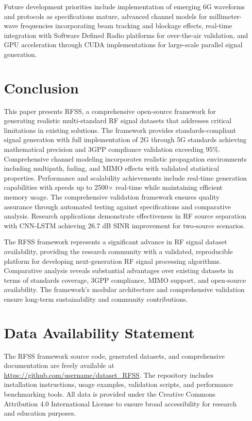 \documentclass[twocolumn,10pt]{article}
\begin{document}
Future development priorities include implementation of emerging 6G waveforms and protocols as specifications mature, advanced channel models for millimeter-wave frequencies incorporating beam tracking and blockage effects, real-time integration with Software Defined Radio platforms for over-the-air validation, and GPU acceleration through CUDA implementations for large-scale parallel signal generation.

\section{Conclusion}

This paper presents RFSS, a comprehensive open-source framework for generating realistic multi-standard RF signal datasets that addresses critical limitations in existing solutions. The framework provides standards-compliant signal generation with full implementation of 2G through 5G standards achieving mathematical precision and 3GPP compliance validation exceeding 95\%. Comprehensive channel modeling incorporates realistic propagation environments including multipath, fading, and MIMO effects with validated statistical properties. Performance and scalability achievements include real-time generation capabilities with speeds up to 2500$\times$ real-time while maintaining efficient memory usage. The comprehensive validation framework ensures quality assurance through automated testing against specifications and comparative analysis. Research applications demonstrate effectiveness in RF source separation with CNN-LSTM achieving 26.7 dB SINR improvement for two-source scenarios.

The RFSS framework represents a significant advance in RF signal dataset availability, providing the research community with a validated, reproducible platform for developing next-generation RF signal processing algorithms. Comparative analysis reveals substantial advantages over existing datasets in terms of standards coverage, 3GPP compliance, MIMO support, and open-source availability. The framework's modular architecture and comprehensive validation ensure long-term sustainability and community contributions.

\section*{Data Availability Statement}

The RFSS framework source code, generated datasets, and comprehensive documentation are freely available at \url{https://github.com/username/dataset_RFSS}. The repository includes installation instructions, usage examples, validation scripts, and performance benchmarking tools. All data is provided under the Creative Commons Attribution 4.0 International License to ensure broad accessibility for research and education purposes.



\end{document}
